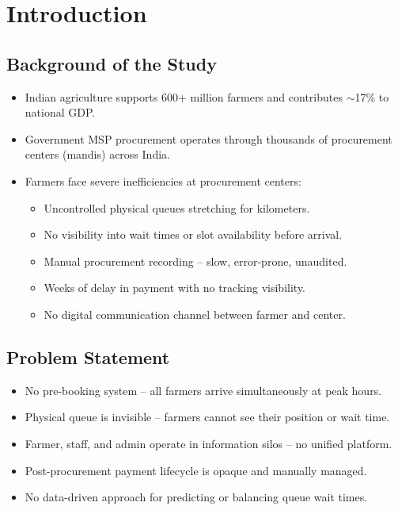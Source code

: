 \chapter{Introduction}

\section{Background of the Study}
\begin{itemize}
  \item Indian agriculture supports 600+ million farmers and contributes $\sim$17\% to national GDP.
  \item Government MSP procurement operates through thousands of procurement centers (mandis) across India.
  \item Farmers face severe inefficiencies at procurement centers:
    \begin{itemize}
      \item Uncontrolled physical queues stretching for kilometers.
      \item No visibility into wait times or slot availability before arrival.
      \item Manual procurement recording -- slow, error-prone, unaudited.
      \item Weeks of delay in payment with no tracking visibility.
      \item No digital communication channel between farmer and center.
    \end{itemize}
\end{itemize}

\section{Problem Statement}
\begin{itemize}
  \item No pre-booking system -- all farmers arrive simultaneously at peak hours.
  \item Physical queue is invisible -- farmers cannot see their position or wait time.
  \item Farmer, staff, and admin operate in information silos -- no unified platform.
  \item Post-procurement payment lifecycle is opaque and manually managed.
  \item No data-driven approach for predicting or balancing queue wait times.
\end{itemize}

